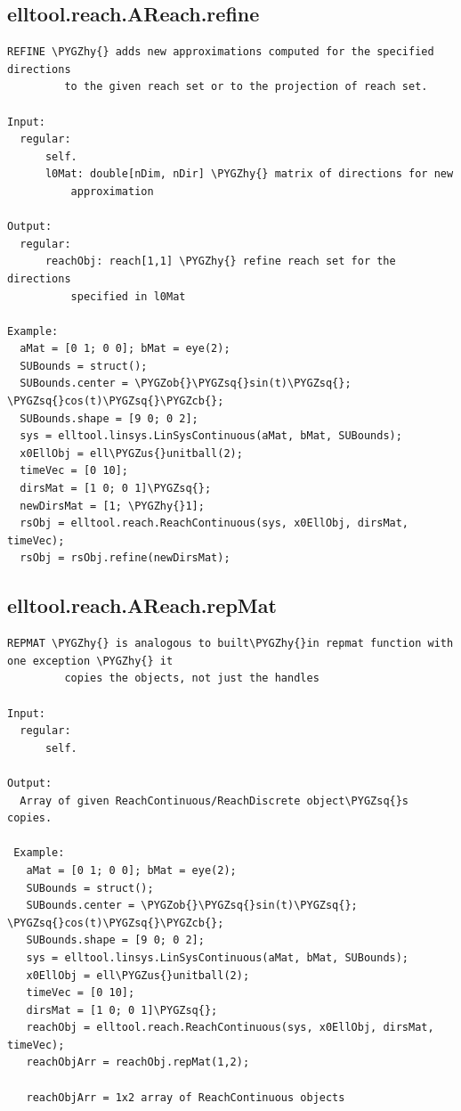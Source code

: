 \documentclass[letterpaper,10pt,english]{sphinxmanual}
\def\PYGZus{\char`\_}
\def\PYGZob{\char`\{}
\def\PYGZcb{\char`\}}
\def\PYGZhy{\char`\-}
\def\PYGZsq{\char`\'}
\begin{document}
\subsection{elltool.reach.AReach.refine}
\label{chap_functions:elltool-reach-areach-refine}
\begin{Verbatim}[commandchars=\\\{\}]
REFINE \PYGZhy{} adds new approximations computed for the specified directions
         to the given reach set or to the projection of reach set.

Input:
  regular:
      self.
      l0Mat: double[nDim, nDir] \PYGZhy{} matrix of directions for new
          approximation

Output:
  regular:
      reachObj: reach[1,1] \PYGZhy{} refine reach set for the directions
          specified in l0Mat

Example:
  aMat = [0 1; 0 0]; bMat = eye(2);
  SUBounds = struct();
  SUBounds.center = \PYGZob{}\PYGZsq{}sin(t)\PYGZsq{}; \PYGZsq{}cos(t)\PYGZsq{}\PYGZcb{};
  SUBounds.shape = [9 0; 0 2];
  sys = elltool.linsys.LinSysContinuous(aMat, bMat, SUBounds);
  x0EllObj = ell\PYGZus{}unitball(2);
  timeVec = [0 10];
  dirsMat = [1 0; 0 1]\PYGZsq{};
  newDirsMat = [1; \PYGZhy{}1];
  rsObj = elltool.reach.ReachContinuous(sys, x0EllObj, dirsMat, timeVec);
  rsObj = rsObj.refine(newDirsMat);
\end{Verbatim}


\subsection{elltool.reach.AReach.repMat}
\label{chap_functions:elltool-reach-areach-repmat}
\begin{Verbatim}[commandchars=\\\{\}]
REPMAT \PYGZhy{} is analogous to built\PYGZhy{}in repmat function with one exception \PYGZhy{} it
         copies the objects, not just the handles

Input:
  regular:
      self.

Output:
  Array of given ReachContinuous/ReachDiscrete object\PYGZsq{}s copies.

 Example:
   aMat = [0 1; 0 0]; bMat = eye(2);
   SUBounds = struct();
   SUBounds.center = \PYGZob{}\PYGZsq{}sin(t)\PYGZsq{}; \PYGZsq{}cos(t)\PYGZsq{}\PYGZcb{};
   SUBounds.shape = [9 0; 0 2];
   sys = elltool.linsys.LinSysContinuous(aMat, bMat, SUBounds);
   x0EllObj = ell\PYGZus{}unitball(2);
   timeVec = [0 10];
   dirsMat = [1 0; 0 1]\PYGZsq{};
   reachObj = elltool.reach.ReachContinuous(sys, x0EllObj, dirsMat, timeVec);
   reachObjArr = reachObj.repMat(1,2);

   reachObjArr = 1x2 array of ReachContinuous objects
\end{Verbatim}
\end{document}

